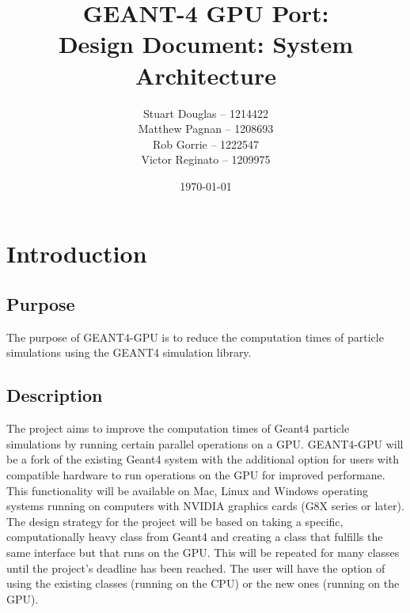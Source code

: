 \documentclass[12pt]{article}
\begin{document}
\title{
\LARGE GEANT-4 GPU Port:
\\\vspace{10mm}
\large \textbf{Design Document: System Architecture}
\vspace{20mm}
}
\author{
Stuart Douglas -- 1214422
\\Matthew Pagnan -- 1208693
\\Rob Gorrie -- 1222547
\\Victor Reginato -- 1209975
\vspace{10mm}
}
\date{\today}
	
\maketitle
\newpage

\renewcommand{\contentsname}{Table of Contents}
\tableofcontents
 
\section{Introduction}%
\subsection{Purpose}
The purpose of GEANT4-GPU is to reduce the computation times of particle simulations using the GEANT4 simulation library.

\subsection{Description}
The project aims to improve the computation times of Geant4 particle simulations by running certain parallel operations on a GPU. GEANT4-GPU will be a fork of the existing Geant4 system with the additional option for users with compatible hardware to run operations on the GPU for improved performane. This functionality will be available on Mac, Linux and Windows operating systems running on computers with NVIDIA graphics cards (G8X series or later).\\

The design strategy for the project will be based on taking a specific, computationally heavy class from Geant4 and creating a class that fulfills the same interface but that runs on the GPU. This will be repeated for many classes until the project's deadline has been reached. The user will have the option of using the existing classes (running on the CPU) or the new ones (running on the GPU).
\end{document}
